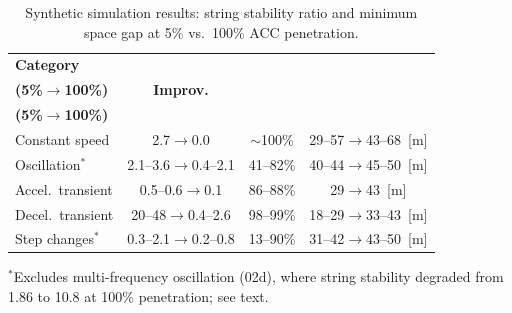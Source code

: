 \documentclass[conference]{IEEEtran}
\begin{document}

\begin{table}[htbp]
\caption{Synthetic simulation results: string stability ratio and minimum space gap at 5\% vs.\ 100\% ACC penetration.}
\begin{center}
\begin{tabular}{|l|c|c|c|}
\hline
\textbf{Category} &
\shortstack{\textbf{SS}\\\textbf{(5\%$\to$100\%)}} &
\textbf{Improv.} &
\shortstack{\textbf{Min Gap}\\\textbf{(5\%$\to$100\%)}} \\
\hline
Constant speed & 2.7$\to$0.0 & $\sim$100\% & 29--57$\to$43--68~[m] \\
\hline
Oscillation$^*$ & 2.1--3.6$\to$0.4--2.1 & 41--82\% & 40--44$\to$45--50~[m] \\
\hline
Accel.\ transient & 0.5--0.6$\to$0.1 & 86--88\% & 29$\to$43~[m] \\
\hline
Decel.\ transient & 20--48$\to$0.4--2.6 & 98--99\% & 18--29$\to$33--43~[m] \\
\hline
Step changes$^*$ & 0.3--2.1$\to$0.2--0.8 & 13--90\% & 31--42$\to$43--50~[m] \\
\hline
\end{tabular}
\label{tab:synth-summary}
\end{center}
\vspace{-0.5em}
{\footnotesize $^*$Excludes multi-frequency oscillation (02d), where string stability degraded from 1.86 to 10.8 at 100\% penetration; see text.}
\end{table}
\end{document}
